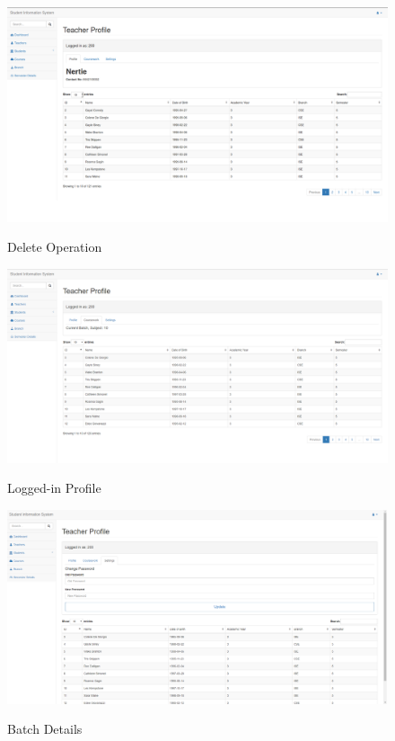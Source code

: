 \begin{figure}[H]
\centering
\caption{Delete Operation}
\includegraphics[width=\textwidth,height=\textheight,keepaspectratio]{./snaps/12.png}
\\[0.2in]
\label{fig:Delete Operation}
\end{figure}

\begin{figure}[H]
\centering
\caption{Logged-in Profile}
\includegraphics[width=\textwidth,height=\textheight,keepaspectratio]{./snaps/13.png}
\\[0.2in]
\label{fig:Logged-in Profile}
\end{figure}

\begin{figure}[H]
\centering
\caption{Batch Details}
\includegraphics[width=\textwidth,height=\textheight,keepaspectratio]{./snaps/14.png}
\\[0.2in]
\label{fig:Batch Details}
\end{figure}